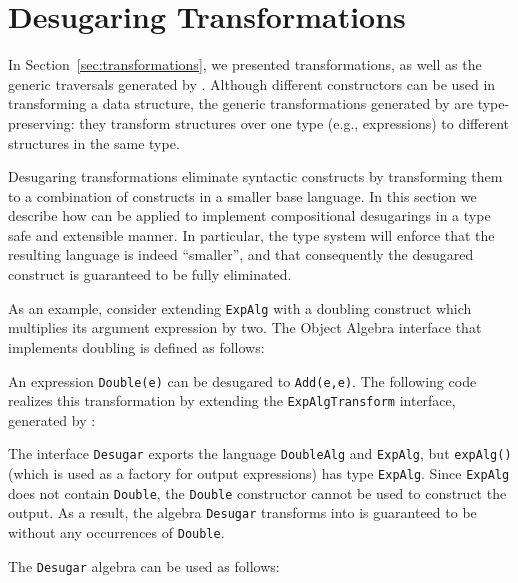 \section{Desugaring Transformations}\label{sec:heterotrans}


In Section~\ref{sec:transformations}, we presented transformations, as well as the generic traversals generated by \name. Although different constructors can be used in transforming a data structure, the generic transformations generated by \name are type-preserving: they transform structures over one type (e.g., expressions) to different structures in the same type.

Desugaring transformations eliminate syntactic constructs by transforming them to a combination of constructs in a smaller base language. In this section we describe how \Name can be applied to implement compositional desugarings in a type safe and extensible manner. In particular, the type system will enforce that the resulting language is indeed ``smaller'', and that consequently the desugared construct is guaranteed to be fully eliminated. 

As an example, consider extending \lstinline{ExpAlg} with a doubling construct which multiplies its argument expression by two. The Object Algebra interface that implements doubling is defined as follows: 


An expression \lstinline{Double(e)} can be desugared to \lstinline{Add(e,e)}.
The following code realizes this transformation by extending the  \lstinline{ExpAlgTransform} interface, generated by \Name:


The interface \lstinline{Desugar} exports the language \lstinline{DoubleAlg} and \lstinline{ExpAlg}, but \lstinline{expAlg()} (which is used as a factory for output expressions) has type \lstinline{ExpAlg}. Since \lstinline{ExpAlg} does not contain \lstinline{Double}, the \lstinline{Double} constructor cannot be used to construct the output. As a result, the algebra \lstinline{Desugar} transforms into is guaranteed to be without any occurrences of \lstinline{Double}. 

The \lstinline{Desugar} algebra can be used as follows:

